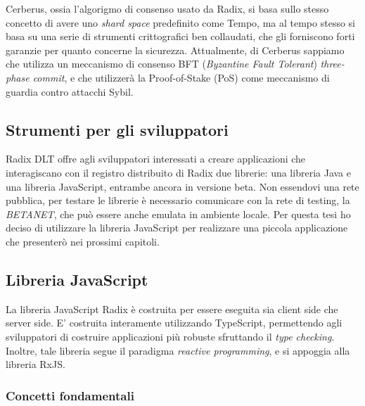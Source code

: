 Cerberus, ossia l'algorigmo di consenso usato da Radix, si basa sullo stesso concetto di avere uno \textit{shard space} predefinito come Tempo, ma al tempo stesso si basa su una serie di strumenti crittografici ben collaudati, che gli forniscono forti garanzie per quanto concerne la sicurezza. Attualmente, di Cerberus sappiamo che utilizza un meccanismo di consenso BFT (\textit{Byzantine Fault Tolerant}) \textit{three-phase commit}, e che utilizzerà la Proof-of-Stake (PoS) come meccanismo di guardia contro attacchi Sybil. 

\subsection{Strumenti per gli sviluppatori}

Radix DLT offre agli sviluppatori interessati a creare applicazioni che interagiscano con il registro distribuito di Radix due librerie: una libreria Java e una libreria JavaScript, entrambe ancora in versione beta. Non essendovi una rete pubblica, per testare le librerie è necessario comunicare con la rete di testing, la \textit{BETANET}, che può essere anche emulata in ambiente locale. Per questa tesi ho deciso di utilizzare la libreria JavaScript per realizzare una piccola applicazione che presenterò nei prossimi capitoli.

\subsection{Libreria JavaScript}

La libreria JavaScript Radix è costruita per essere eseguita sia client side che server side. E' costruita interamente utilizzando TypeScript, permettendo agli sviluppatori di costruire applicazioni più robuste sfruttando il \textit{type checking}. Inoltre, tale libreria segue il paradigma \textit{reactive programming}, e si appoggia alla libreria RxJS.

\subsubsection{Concetti fondamentali}

